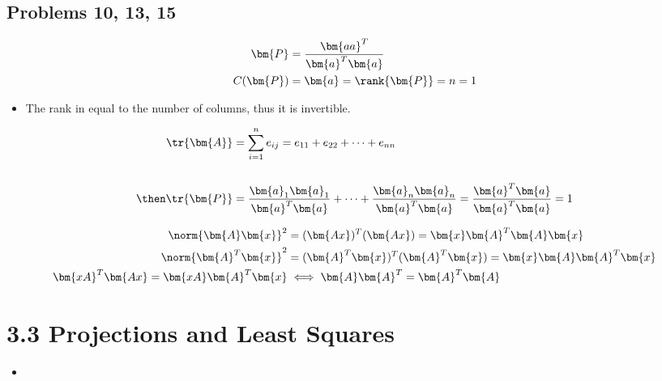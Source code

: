 \begin{itemize}
  \newpage
  \subsection{Problems 10, 13, 15}
  \begin{itemize}
    \begin{align*}
      \bm{P} &= \frac{\bm{aa}^T}{\bm{a}^T \bm{a}} \\
      C(\bm{P}) &= \bm{a} = \rank{\bm{P}} = n = 1
    \end{align*}
    \begin{itemize}
      \item The rank in equal to the number of columns, thus it is invertible.
    \end{itemize}


    \begin{align*}
      \tr{\bm{A}} &= \sum_{i=1}^{n} e_{ij} = e_{11} + e_{22} + \cdots + e_{nn} \\\\
    \then \tr{\bm{P}} &= \frac{\bm{a}_1 \bm{a}_1}{\bm{a}^T \bm{a}}
    +\cdots+
    \frac{\bm{a}_n \bm{a}_n}{\bm{a}^T \bm{a}} =
    \frac{\bm{a}^T  \bm{a}}{\bm{a}^T \bm{a}} = 1 \\
    \end{align*}

    \begin{align*}
      \norm{\bm{A} \bm{x}}^2 &= (\bm{Ax})^T (\bm{Ax}) = \bm{x}\bm{A}^T \bm{A}\bm{x} \\
      \norm{\bm{A}^T  \bm{x}}^2 &= (\bm{A}^T \bm{x})^T (\bm{A}^T \bm{x}) = \bm{x}\bm{A}\bm{A}^T \bm{x}\\
      \bm{xA}^T \bm{Ax} = \bm{xA}\bm{A}^T \bm{x} &\iff \bm{A}\bm{A}^T = \bm{A}^T \bm{A}
    \end{align*}
  \end{itemize}

\end{itemize}

\section{3.3 Projections and Least Squares}
\begin{itemize}
  \item []

\end{itemize}

